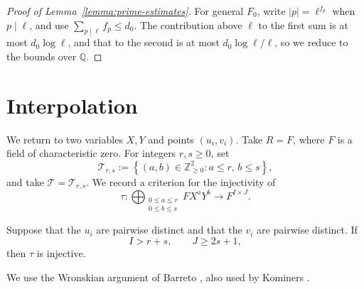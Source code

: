 \documentclass[reqno]{amsart} 
\begin{document}
\begin{proof}[Proof of Lemma~\ref{lemma:prime-estimates}]
  For general $F_0$, write $|p|=\ell^{f_p}$ when $p\mid\ell$, and use $\sum_{p\mid\ell}f_p\leq d_0$.  The contribution above $\ell$ to the first sum is at most $d_0\log\ell$, and that to the second is at most $d_0\log\ell/\ell$, so we reduce to the bounds over $\mathbb{Q}$.
\end{proof}

\section{Interpolation}\label{appendix:interpolation}

We return to two variables $X,Y$ and points $(u_i,v_i)$.  Take $R = F$, where $F$ is a field of characteristic zero.  For integers $r, s \geq 0$, set
\begin{equation*}
  \mathcal{T}_{r, s} := \left\{(a, b) \in \mathbb{Z}_{\geq 0}^2 : a \leq r, \, b \leq s \right\},
\end{equation*}
and take $\mathcal{T} = \mathcal{T}_{r, s}$.  We record a criterion for the injectivity of
\begin{equation*}
  \tau : \bigoplus_{\substack{0 \leq a \leq r \\ 0 \leq b \leq s}} F X^a Y^b \longrightarrow F^{I \times J}.
\end{equation*}
\begin{proposition}\label{prop:interpolation}
  Suppose that the $u_i$ are pairwise distinct and that the $v_i$ are pairwise distinct.  If
  \begin{equation}\label{eq:cus6n5zz8x}
    I > r + s, \qquad J \geq 2s + 1,
  \end{equation}
  then $\tau$ is injective.
\end{proposition}
We use the Wronskian argument of Barreto \cite[proof of Theorem 1]{Barreto2026SiegelZeros}, also used by Kominers \cite[proof of Theorem 1]{Kominers2026FrobeniusPrimeSums}.
\end{document}
